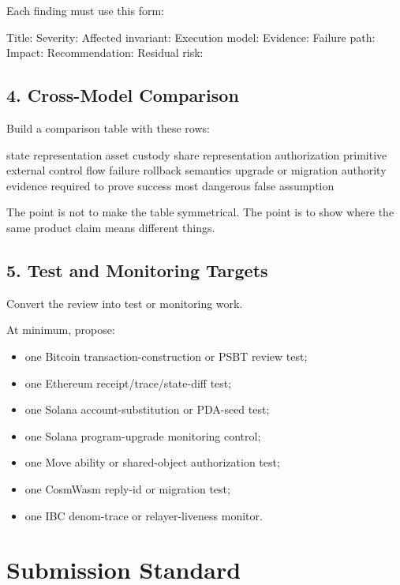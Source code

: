 Each finding must use this form:

\begin{codeblock}
Title:
Severity:
Affected invariant:
Execution model:
Evidence:
Failure path:
Impact:
Recommendation:
Residual risk:
\end{codeblock}

\subsection*{4. Cross-Model Comparison}

Build a comparison table with these rows:

\begin{codeblock}
state representation
asset custody
share representation
authorization primitive
external control flow
failure rollback semantics
upgrade or migration authority
evidence required to prove success
most dangerous false assumption
\end{codeblock}

The point is not to make the table symmetrical. The point is to show where the same product claim means different things.

\subsection*{5. Test and Monitoring Targets}

Convert the review into test or monitoring work.

At minimum, propose:

\begin{itemize}
\item one Bitcoin transaction-construction or PSBT review test;
\item one Ethereum receipt/trace/state-diff test;
\item one Solana account-substitution or PDA-seed test;
\item one Solana program-upgrade monitoring control;
\item one Move ability or shared-object authorization test;
\item one CosmWasm reply-id or migration test;
\item one IBC denom-trace or relayer-liveness monitor.
\end{itemize}

\section*{Submission Standard}

